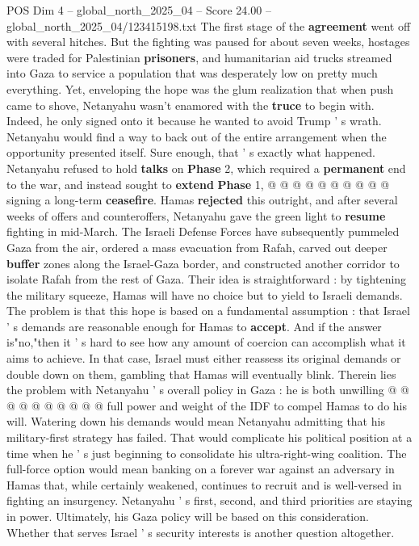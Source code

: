 \begin{textsample}{POS Dim 4 – global\_north\_2025\_04 – Score 24.00 – global\_north\_2025\_04/123415198.txt}
The first stage of the \textbf{agreement} went off with several hitches.
But the fighting was paused for about seven weeks, hostages were traded for Palestinian \textbf{prisoners}, and humanitarian aid trucks streamed into Gaza to service a population that was desperately low on pretty much everything.
Yet, enveloping the hope was the glum realization that when push came to shove, Netanyahu wasn't enamored with the \textbf{truce} to begin with.
Indeed, he only signed onto it because he wanted to avoid Trump ' s wrath.
Netanyahu would find a way to back out of the entire arrangement when the opportunity presented itself.
Sure enough, that ' s exactly what happened.
Netanyahu refused to hold \textbf{talks} on \textbf{Phase} 2, which required a \textbf{permanent} end to the war, and instead sought to \textbf{extend} \textbf{Phase} 1, @ @ @ @ @ @ @ @ @ @ signing a long-term \textbf{ceasefire}.
Hamas \textbf{rejected} this outright, and after several weeks of offers and counteroffers, Netanyahu gave the green light to \textbf{resume} fighting in mid-March.
The Israeli Defense Forces have subsequently pummeled Gaza from the air, ordered a mass evacuation from Rafah, carved out deeper \textbf{buffer} zones along the Israel-Gaza border, and constructed another corridor to isolate Rafah from the rest of Gaza.
Their idea is straightforward : by tightening the military squeeze, Hamas will have no choice but to yield to Israeli demands.
The problem is that this hope is based on a fundamental assumption : that Israel ' s demands are reasonable enough for Hamas to \textbf{accept}.
And if the answer is"no,"then it ' s hard to see how any amount of coercion can accomplish what it aims to achieve.
In that case, Israel must either reassess its original demands or double down on them, gambling that Hamas will eventually blink.
Therein lies the problem with Netanyahu ' s overall policy in Gaza : he is both unwilling @ @ @ @ @ @ @ @ @ @ full power and weight of the IDF to compel Hamas to do his will.
Watering down his demands would mean Netanyahu admitting that his military-first strategy has failed.
That would complicate his political position at a time when he ' s just beginning to consolidate his ultra-right-wing coalition.
The full-force option would mean banking on a forever war against an adversary in Hamas that, while certainly weakened, continues to recruit and is well-versed in fighting an insurgency.
Netanyahu ' s first, second, and third priorities are staying in power.
Ultimately, his Gaza policy will be based on this consideration.
Whether that serves Israel ' s security interests is another question altogether.

\end{textsample}
